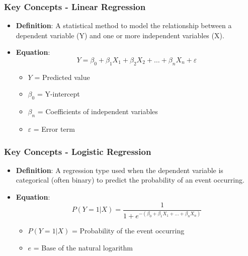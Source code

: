 \documentclass[aspectratio=169]{beamer}
\begin{document}
\begin{frame}[fragile]
    \frametitle{Key Concepts - Linear Regression}
    \begin{itemize}
        \item \textbf{Definition}: A statistical method to model the relationship between a dependent variable (Y) and one or more independent variables (X).
        \item \textbf{Equation}:
        \begin{equation}
            Y = \beta_0 + \beta_1X_1 + \beta_2X_2 + \ldots + \beta_nX_n + \varepsilon
        \end{equation}
        \begin{itemize}
            \item $Y$ = Predicted value
            \item $\beta_0$ = Y-intercept
            \item $\beta_n$ = Coefficients of independent variables
            \item $\varepsilon$ = Error term
        \end{itemize}
    \end{itemize}
\end{frame}

\begin{frame}[fragile]
    \frametitle{Key Concepts - Logistic Regression}
    \begin{itemize}
        \item \textbf{Definition}: A regression type used when the dependent variable is categorical (often binary) to predict the probability of an event occurring.
        \item \textbf{Equation}:
        \begin{equation}
            P(Y=1 | X) = \frac{1}{1 + e^{-(\beta_0 + \beta_1X_1 + \ldots + \beta_nX_n)}}
        \end{equation}
        \begin{itemize}
            \item $P(Y=1 | X)$ = Probability of the event occurring
            \item $e$ = Base of the natural logarithm
        \end{itemize}
    \end{itemize}
\end{frame}
\end{document}
